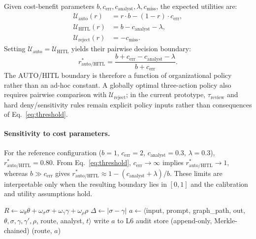 \documentclass[journal]{IEEEtran}
\begin{document}
Given cost-benefit parameters $b, c_{\text{err}}, c_{\text{analyst}}, \lambda, c_{\text{miss}}$,
the expected utilities are:
\begin{align}
\mathcal{U}_{\text{auto}}(r) &= r \cdot b - (1-r) \cdot c_{\text{err}}, \\
\mathcal{U}_{\text{HITL}}(r) &= b - c_{\text{analyst}} - \lambda, \\
\mathcal{U}_{\text{reject}}(r) &= -c_{\text{miss}}.
\end{align}
Setting $\mathcal{U}_{\text{auto}} = \mathcal{U}_{\text{HITL}}$ yields their pairwise decision boundary:
\begin{equation}
r^*_{\text{auto/HITL}} = \frac{b + c_{\text{err}} - c_{\text{analyst}} - \lambda}{b + c_{\text{err}}}.
\label{eq:threshold}
\end{equation}
The AUTO/HITL boundary is therefore a function of organizational policy rather than an ad-hoc
constant. A globally optimal three-action policy also requires pairwise comparison with
$\mathcal{U}_{\text{reject}}$; in the current prototype, $\tau_{\text{review}}$ and hard
deny/sensitivity rules remain explicit policy inputs rather than consequences of Eq.~\eqref{eq:threshold}.

\paragraph{Sensitivity to cost parameters.}
For the reference configuration ($b{=}1$, $c_{\text{err}}{=}2$, $c_{\text{analyst}}{=}0.3$,
$\lambda{=}0.3$), $r^*_{\text{auto/HITL}}{=}0.80$. From Eq.~\eqref{eq:threshold},
$c_{\text{err}} \to \infty$ implies $r^*_{\text{auto/HITL}} \to 1$, whereas
$b \gg c_{\text{err}}$ gives
$r^*_{\text{auto/HITL}} \approx 1-(c_{\text{analyst}}+\lambda)/b$.
These limits are interpretable only when the resulting boundary lies in $[0,1]$ and the
calibration and utility assumptions hold.

\begin{algorithm}[!t]
\caption{PC3 -- Human Validation and Hallucination Control}
\label{alg:pc3}
\SetAlgoLined
\DontPrintSemicolon
{}
$R \gets \omega_\theta\theta + \omega_\sigma\sigma + \omega_\gamma\gamma + \omega_\rho\rho$\;
$\Delta \gets |\sigma - \gamma|$\;
$a \gets \langle$input, prompt, graph\_path, out, $\theta,\sigma,\gamma,\gamma',\rho$, route, analyst, $t\rangle$\;
write $a$ to L6 audit store (append-only, Merkle-chained)\;
\Return (route, $a$)
\end{algorithm}
\end{document}
